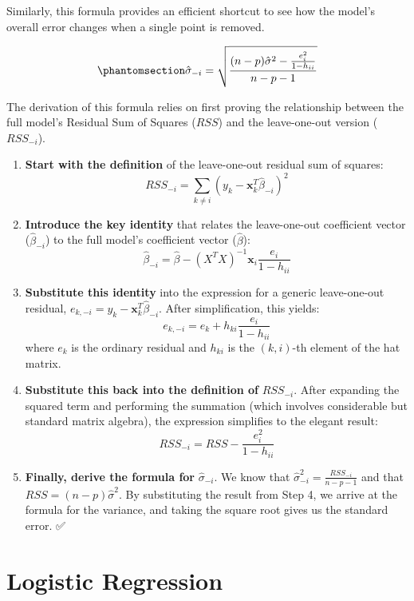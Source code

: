 \documentclass[
  letterpaper,
  DIV=11,
  numbers=noendperiod]{scrreprt}
\begin{document}
Similarly, this formula provides an efficient shortcut to see how the
model's overall error changes when a single point is removed.

\begin{equation}\phantomsection\label{eq-sigma_-i}{\hat{\sigma}_{-i} = \sqrt{\frac{(n-p)\hat{\sigma}^2 - \frac{e_i^2}{1-h_{ii}}}{n-p-1}}}\end{equation}

The derivation of this formula relies on first proving the relationship
between the full model's Residual Sum of Squares (\(RSS\)) and the
leave-one-out version (\(RSS_{-i}\)).

\begin{enumerate}
\def\labelenumi{\arabic{enumi}.}
\item
  \textbf{Start with the definition} of the leave-one-out residual sum
  of squares: \[
  RSS_{-i} = \sum_{k \neq i} (y_k - \mathbf{x}_k^T\hat{\beta}_{-i})^2
  \]
\item
  \textbf{Introduce the key identity} that relates the leave-one-out
  coefficient vector (\(\hat{\beta}_{-i}\)) to the full model's
  coefficient vector (\(\hat{\beta}\)): \[
  \hat{\beta}_{-i} = \hat{\beta} - (X^TX)^{-1}\mathbf{x}_i \frac{e_i}{1 - h_{ii}}
  \]
\item
  \textbf{Substitute this identity} into the expression for a generic
  leave-one-out residual,
  \(e_{k,-i} = y_k - \mathbf{x}_k^T\hat{\beta}_{-i}\). After
  simplification, this yields: \[
  e_{k,-i} = e_k + h_{ki} \frac{e_i}{1 - h_{ii}}
  \] where \(e_k\) is the ordinary residual and \(h_{ki}\) is the
  \((k,i)\)-th element of the hat matrix.
\item
  \textbf{Substitute this back into the definition of} \(RSS_{-i}\).
  After expanding the squared term and performing the summation (which
  involves considerable but standard matrix algebra), the expression
  simplifies to the elegant result: \[
  RSS_{-i} = RSS - \frac{e_i^2}{1 - h_{ii}}
  \]
\item
  \textbf{Finally, derive the formula for} \(\hat{\sigma}_{-i}\). We
  know that \(\hat{\sigma}^2_{-i} = \frac{RSS_{-i}}{n-p-1}\) and that
  \(RSS = (n-p)\hat{\sigma}^2\). By substituting the result from Step 4,
  we arrive at the formula for the variance, and taking the square root
  gives us the standard error. ✅
\end{enumerate}

\section{Logistic Regression}\label{logistic-regression}
\end{document}
